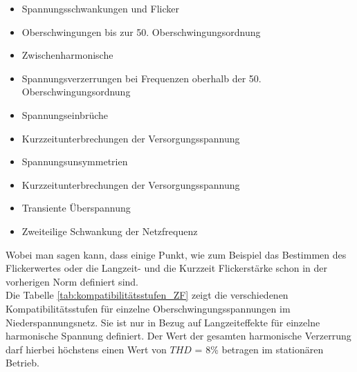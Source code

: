 \begin{appendix}
\begin{itemize}
	\item Spannungsschwankungen und Flicker 
	\item Oberschwingungen bis zur 50. Oberschwingungsordnung
	\item Zwischenharmonische
	\item Spannungsverzerrungen bei Frequenzen oberhalb der 50. Oberschwingungsordnung
	\item Spannungseinbrüche
	\item Kurzzeitunterbrechungen der Versorgungsspannung
	\item Spannungsunsymmetrien
	\item Kurzzeitunterbrechungen der Versorgungsspannung
	\item Transiente Überspannung
	\item Zweiteilige Schwankung der Netzfrequenz
\end{itemize}
Wobei man sagen kann, dass einige Punkt, wie zum Beispiel das Bestimmen des Flickerwertes oder die Langzeit- und die Kurzzeit Flickerstärke schon in der vorherigen Norm definiert sind.\\
Die Tabelle \ref{tab:kompatibilitätsstufen_ZF} zeigt die verschiedenen Kompatibilitätsstufen für einzelne Oberschwingungsspannungen im Niederspannungsnetz. Sie ist nur in Bezug auf Langzeiteffekte für einzelne harmonische Spannung definiert. Der Wert der gesamten harmonische Verzerrung darf hierbei höchstens einen Wert von $THD$ = 8\% betragen im stationären Betrieb.
\begin{table}[ht!]
	\centering
\end{table}
\end{appendix}
